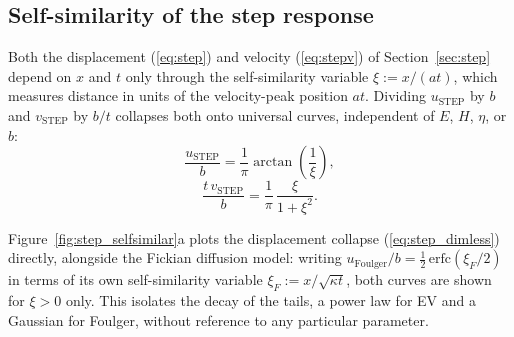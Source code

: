 \documentclass[extra]{gji}
\begin{document}
\subsection{Self-similarity of the step response}
\label{sec:step_selfsimilar}

Both the displacement (\ref{eq:step}) and velocity (\ref{eq:stepv}) of
Section~\ref{sec:step} depend on $x$ and $t$ only through the
self-similarity variable $\xi := x/(at)$, which measures distance in units
of the velocity-peak position $at$. Dividing $u_{\text{STEP}}$ by $b$ and
$v_{\text{STEP}}$ by $b/t$ collapses both onto universal curves,
independent of $E$, $H$, $\eta$, or $b$:
\begin{equation}
\frac{u_{\text{STEP}}}{b} = \frac{1}{\pi}\arctan\!\left(\frac{1}{\xi}\right),
\label{eq:step_dimless}
\end{equation}
\begin{equation}
\frac{t\,v_{\text{STEP}}}{b} = \frac{1}{\pi}\,\frac{\xi}{1+\xi^2}.
\label{eq:stepv_dimless}
\end{equation}

Figure~\ref{fig:step_selfsimilar}a plots the displacement collapse
(\ref{eq:step_dimless}) directly, alongside the Fickian
\citet{foulger1992post} diffusion model: writing $u_{\text{Foulger}}/b = \tfrac{1}{2}\,\mathrm{erfc}(\xi_F/2)$ in
terms of its own self-similarity variable $\xi_F := x/\sqrt{\kappa t}$,
both curves are shown for $\xi>0$ only. This isolates the decay of the
tails, a power law for EV and a Gaussian for Foulger, without reference
to any particular parameter.
\end{document}
